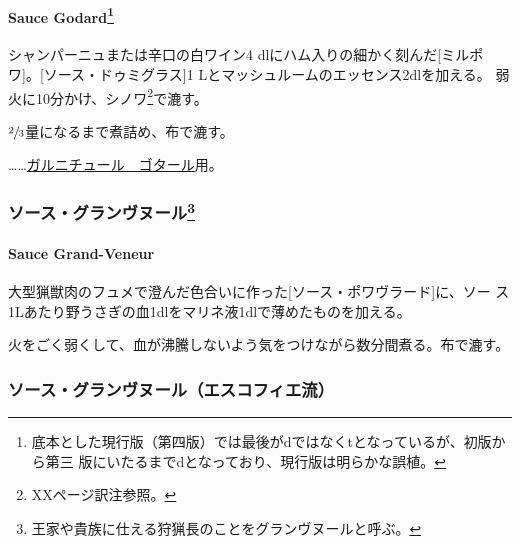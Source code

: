 \hypertarget{sauce-godard}{%
\paragraph[Sauce Godard]{\texorpdfstring{Sauce Godard\footnote{底本とした現行版（第四版）では最後がdではなくtとなっているが、初版から第三
  版にいたるまでdとなっており、現行版は明らかな誤植。}}{Sauce Godard}}\label{sauce-godard}}


シャンパーニュまたは辛口の白ワイン4 dlにハム入りの細かく刻んだ{[}ミルポ
ワ{]}。{[}ソース・ドゥミグラス{]}1
Lとマッシュルームのエッセンス2dlを加える。
弱火に10分かけ、シノワ\footnote{XXページ訳注参照。}で漉す。

\(\sfrac{2}{3}\)量になるまで煮詰め、布で漉す。

\ldots{}\ldots{}\href{}{ガルニチュール　ゴタール}用。

\maeaki

\hypertarget{ux30bdux30fcux30b9ux30b0ux30e9ux30f3ux30f4ux30ccux30fcux30eb40}{%
\subsubsection[ソース・グランヴヌール]{\texorpdfstring{ソース・グランヴヌール\footnote{王家や貴族に仕える狩猟長のことをグランヴヌールと呼ぶ。}}{ソース・グランヴヌール}}\label{ux30bdux30fcux30b9ux30b0ux30e9ux30f3ux30f4ux30ccux30fcux30eb40}}

\hypertarget{sauce-grand-veneur}{%
\paragraph{Sauce Grand-Veneur}\label{sauce-grand-veneur}}


大型猟獣肉のフュメで澄んだ色合いに作った{[}ソース・ポワヴラード{]}に、ソー
ス1Lあたり野うさぎの血1dlをマリネ液1dlで薄めたものを加える。

火をごく弱くして、血が沸騰しないよう気をつけながら数分間煮る。布で漉す。

\maeaki

\hypertarget{ux30bdux30fcux30b9ux30b0ux30e9ux30f3ux30f4ux30ccux30fcux30ebux30a8ux30b9ux30b3ux30d5ux30a3ux30a8ux6d41}{%
\subsubsection{ソース・グランヴヌール（エスコフィエ流）}\label{ux30bdux30fcux30b9ux30b0ux30e9ux30f3ux30f4ux30ccux30fcux30ebux30a8ux30b9ux30b3ux30d5ux30a3ux30a8ux6d41}}

